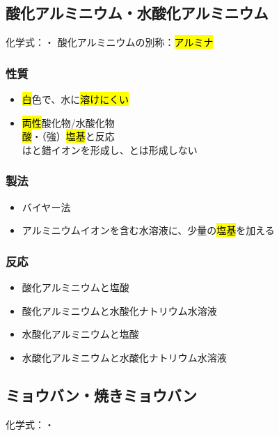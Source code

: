 \subsection{酸化アルミニウム・水酸化アルミニウム}
化学式：\hl{}・\hl{}
酸化アルミニウムの別称：\hl{アルミナ}
\subsubsection{性質}
\begin{itemize}
  \item \hl{白}色で、水に\hl{溶けにくい}
  \item \hl{両性}酸化物/水酸化物\\
        \hl{酸}・（強）\hl{塩基}と反応\\
        は\hl{}と錯イオンを形成し、\hl{}とは形成しない
\end{itemize}
\subsubsection{製法}
\begin{itemize}
  \item バイヤー法
  \item アルミニウムイオンを含む水溶液に、少量の\hl{塩基}を加える \\
\end{itemize}
\subsubsection{反応}
\begin{itemize}
  \item 酸化アルミニウムと塩酸\\
  \item 酸化アルミニウムと水酸化ナトリウム水溶液\\
  \item 水酸化アルミニウムと塩酸\\
  \item 水酸化アルミニウムと水酸化ナトリウム水溶液\\
\end{itemize}
\subsection{ミョウバン・焼きミョウバン}
化学式：\hl{}・\hl{}
